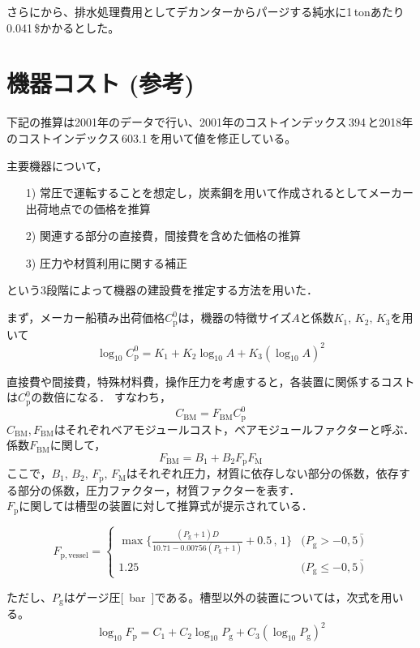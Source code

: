 \documentclass[a4j]{jsreport}
\begin{document}
さらに\cite{講義資料3}から、排水処理費用としてデカンターからパージする純水に1\,tonあたり0.041\,\$かかるとした。



\section{機器コスト (参考\cite{講義資料3})}
下記の推算は2001年のデータで行い、2001年のコストインデックス\,394\,と2018年のコストインデックス\,603.1\,を用いて値を修正している。\par
主要機器について，
\begin{itemize}
    \item[1)]常圧で運転することを想定し，炭素鋼を用いて作成されるとしてメーカー出荷地点での価格を推算
    \item[2)]関連する部分の直接費，間接費を含めた価格の推算
    \item[3)]圧力や材質利用に関する補正
\end{itemize}
という3段階によって機器の建設費を推定する方法を用いた．
\par
まず，メーカー船積み出荷価格$C_\mathrm{p}^0$は，機器の特徴サイズ$A$と係数$K_1,\,K_2,\,K_3$を用いて
\begin{equation}
    \log_{10}C_\mathrm{p}^0 = K_1 + K_2\log_{10} A + K_3(\log_{10} A)^2
\end{equation}
\par
直接費や間接費，特殊材料費，操作圧力を考慮すると，各装置に関係するコストは$C_\mathrm{p}^0$の数倍になる．
すなわち，
\begin{equation}
    C_\mathrm{BM} = F_\mathrm{BM} C_\mathrm{p}^0
\end{equation}
$C_\mathrm{BM}$,\,$ F_\mathrm{BM}$はそれぞれベアモジュールコスト，ベアモジュールファクターと呼ぶ．
係数$F_\mathrm{BM}$に関して，
\begin{equation}
    F_\mathrm{BM} = B_1 + B_2 F_\mathrm{p} F_\mathrm{M}
\end{equation}
ここで，$B_1,\, B_2 ,\,F_\mathrm{p},\, F_\mathrm{M}$はそれぞれ圧力，材質に依存しない部分の係数，依存する部分の係数，圧力ファクター，材質ファクターを表す．\\
$F_\mathrm{p}$に関しては槽型の装置に対して推算式が提示されている．
\begin{center}
\begin{equation}
    F_\mathrm{p,vessel} =
        \begin{cases}
            \max\{\frac{(P_\mathrm{g}+1)D}{10.71-0.00756(P_\mathrm{g}+1)}+0.5 \,,\, 1\} & (P_\mathrm{g} > -0,5\, \bar) \\
            1.25 & (P_\mathrm{g} \leq -0,5\, \bar)
        \end{cases}
\end{equation}
\end{center}
ただし、$P_\mathrm{g}$はゲージ圧\si{[\bar]}である。槽型以外の装置については，次式を用いる。
\begin{equation}
    \log_{10}F_\mathrm{p} = C_1 + C_2\log_{10} P_\mathrm{g} + C_3(\log_{10} P_\mathrm{g})^2
\end{equation}
\end{document}
